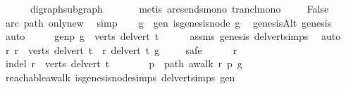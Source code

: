 \begin{isabellebody}
\ \ \ \ \ \ digraph{\isacharunderscore}{\kern0pt}subgraph\ \isanewline
\ \ \ \ \isamarkupfalse%
\ {\isacharparenleft}{\kern0pt}metis\ arcs{\isacharunderscore}{\kern0pt}ends{\isacharunderscore}{\kern0pt}mono\ trancl{\isacharunderscore}{\kern0pt}mono{\isacharparenright}{\kern0pt}\ \isanewline
\ \ \isamarkupfalse%
\ False\ \isamarkupfalse%
\ arc\ path\ only{\isacharunderscore}{\kern0pt}new\ \isamarkupfalse%
\ simp\isanewline
{}\isamarkupfalse%
\isanewline
\ \ \isamarkupfalse%
\ g\ \ gen{\isacharcolon}{\kern0pt}\ {\isachardoublequoteopen}is{\isacharunderscore}{\kern0pt}genesis{\isacharunderscore}{\kern0pt}node\ g{\isachardoublequoteclose}\ \isamarkupfalse%
\ genesisAlt\ genesis\ \isamarkupfalse%
\ auto\isanewline
\ \ \isamarkupfalse%
\ \isamarkupfalse%
\ genp{\isacharcolon}{\kern0pt}\ {\isachardoublequoteopen}g\ {\isasymin}\ verts\ {\isacharparenleft}{\kern0pt}del{\isacharunderscore}{\kern0pt}vert\ t{\isacharparenright}{\kern0pt}{\isachardoublequoteclose}\isanewline
\ \ \ \ \isamarkupfalse%
\ assms{\isacharparenleft}{\kern0pt}{}{\isacharparenright}{\kern0pt}\ genesis\ del{\isacharunderscore}{\kern0pt}vert{\isacharunderscore}{\kern0pt}simps\ \isamarkupfalse%
\ auto\isanewline
\ \ \isamarkupfalse%
\ {\isachardoublequoteopen}{\isacharparenleft}{\kern0pt}{\isasymforall}r{\isachardot}{\kern0pt}\ r\ {\isasymin}\ verts\ {\isacharparenleft}{\kern0pt}del{\isacharunderscore}{\kern0pt}vert\ t{\isacharparenright}{\kern0pt}\ {\isasymlongrightarrow}\ r\ {\isasymrightarrow}\isactrlsup {\isacharasterisk}{\kern0pt}\isactrlbsub del{\isacharunderscore}{\kern0pt}vert\ t\isactrlesub \ g{\isacharparenright}{\kern0pt}{\isachardoublequoteclose}\ \isanewline
\ \ \isamarkupfalse%
\ safe\isanewline
\ \ \ \ \isamarkupfalse%
\ r\isanewline
\ \ \ \ \isamarkupfalse%
\ in{\isacharunderscore}{\kern0pt}del{\isacharcolon}{\kern0pt}\ {\isachardoublequoteopen}r\ {\isasymin}\ verts\ {\isacharparenleft}{\kern0pt}del{\isacharunderscore}{\kern0pt}vert\ t{\isacharparenright}{\kern0pt}{\isachardoublequoteclose}\isanewline
\ \ \ \ \isamarkupfalse%
\ \isamarkupfalse%
\ p\ \ path{\isacharcolon}{\kern0pt}\ {\isachardoublequoteopen}awalk\ r\ p\ g{\isachardoublequoteclose}\ \isanewline
\ \ \ \ \ \ \isamarkupfalse%
\ reachable{\isacharunderscore}{\kern0pt}awalk\ is{\isacharunderscore}{\kern0pt}genesis{\isacharunderscore}{\kern0pt}node{\isachardot}{\kern0pt}simps\ del{\isacharunderscore}{\kern0pt}vert{\isacharunderscore}{\kern0pt}simps\ gen\ \isamarkupfalse%

\end{isabellebody}
